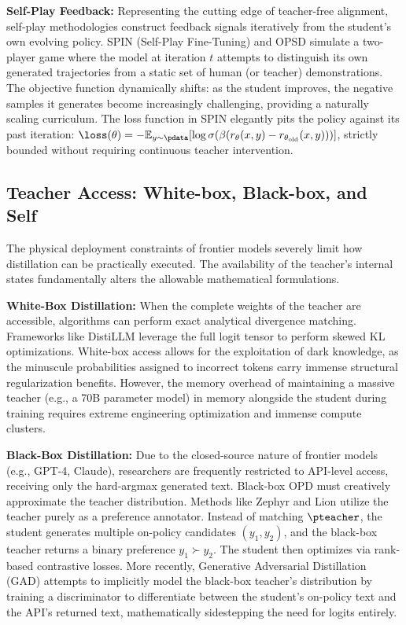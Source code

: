 \textbf{Self-Play Feedback:} Representing the cutting edge of teacher-free alignment, self-play methodologies construct feedback signals iteratively from the student's own evolving policy. SPIN (Self-Play Fine-Tuning) \citep{2401.01335} and OPSD \citep{2601.18734} simulate a two-player game where the model at iteration $t$ attempts to distinguish its own generated trajectories from a static set of human (or teacher) demonstrations. The objective function dynamically shifts: as the student improves, the negative samples it generates become increasingly challenging, providing a naturally scaling curriculum. The loss function in SPIN elegantly pits the policy against its past iteration: $\loss(\theta) = -\mathbb{E}_{y \sim \pdata} [\log \sigma(\beta(r_\theta(x,y) - r_{\theta_{\mathrm{old}}}(x,y)))]$, strictly bounded without requiring continuous teacher intervention.

\subsection{Teacher Access: White-box, Black-box, and Self}
\label{subsec:tax_access}

The physical deployment constraints of frontier models severely limit how distillation can be practically executed. The availability of the teacher's internal states fundamentally alters the allowable mathematical formulations.

\textbf{White-Box Distillation:} When the complete weights of the teacher are accessible, algorithms can perform exact analytical divergence matching. Frameworks like DistiLLM \citep{2402.03898} leverage the full logit tensor to perform skewed KL optimizations. White-box access allows for the exploitation of dark knowledge, as the minuscule probabilities assigned to incorrect tokens carry immense structural regularization benefits. However, the memory overhead of maintaining a massive teacher (e.g., a 70B parameter model) in memory alongside the student during training requires extreme engineering optimization and immense compute clusters.

\textbf{Black-Box Distillation:} Due to the closed-source nature of frontier models (e.g., GPT-4, Claude), researchers are frequently restricted to API-level access, receiving only the hard-argmax generated text. Black-box OPD must creatively approximate the teacher distribution. Methods like Zephyr \citep{2310.06694} and Lion \citep{2310.01382} utilize the teacher purely as a preference annotator. Instead of matching $\pteacher$, the student generates multiple on-policy candidates $(y_1, y_2)$, and the black-box teacher returns a binary preference $y_1 \succ y_2$. The student then optimizes via rank-based contrastive losses. More recently, Generative Adversarial Distillation (GAD) \citep{2511.10643} attempts to implicitly model the black-box teacher's distribution by training a discriminator to differentiate between the student's on-policy text and the API's returned text, mathematically sidestepping the need for logits entirely.


